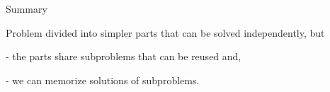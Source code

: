 \begin{frame}{Summary}


\vspace{40pt}\hspace{80pt}\parbox[l][60pt][l]{240pt}{Problem divided into simpler parts that can be solved independently, but 

\vspace{10pt}\pause
-  the parts share subproblems that can be reused and,

\vspace{10pt}\pause
-  we can memorize solutions of subproblems.
}

\end{frame}

